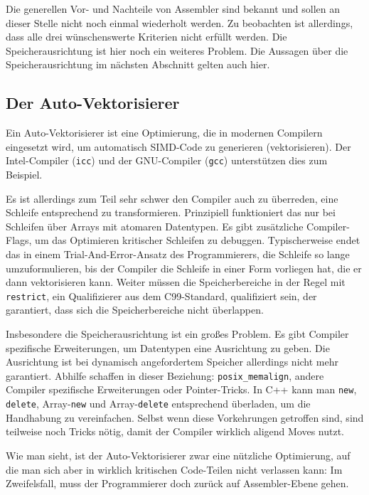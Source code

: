 \documentclass[a4paper,10pt]{article}
\begin{document}
Die generellen Vor- und Nachteile von Assembler sind bekannt und sollen an dieser Stelle nicht noch
einmal wiederholt werden. Zu beobachten ist allerdings, dass alle drei wünschenswerte Kriterien
nicht erfüllt werden. Die Speicherausrichtung ist hier noch ein weiteres Problem. Die Aussagen über
die Speicherausrichtung im nächsten Abschnitt gelten auch hier.

\subsection{Der Auto-Vektorisierer}

Ein Auto-Vektorisierer ist eine Optimierung, die in modernen Compilern eingesetzt wird, um
automatisch SIMD-Code zu generieren (vektorisieren). Der Intel-Compiler (\texttt{icc}) und der
GNU-Compiler (\texttt{gcc}) unterstützen dies zum Beispiel. 

Es ist allerdings zum Teil sehr schwer den Compiler auch zu überreden, eine Schleife entsprechend zu
transformieren. Prinzipiell funktioniert das nur bei Schleifen über Arrays mit atomaren Datentypen.
Es gibt zusätzliche Compiler-Flags, um das Optimieren kritischer Schleifen zu debuggen.
Typischerweise endet das in einem Trial-And-Error-Ansatz des Programmierers, die Schleife so lange
umzuformulieren, bis der Compiler die Schleife in einer Form vorliegen hat, die er dann
vektorisieren kann. Weiter müssen die Speicherbereiche in der Regel mit \texttt{restrict}, ein
Qualifizierer aus dem C99-Standard, qualifiziert sein, der garantiert, dass sich die
Speicherbereiche nicht überlappen.

Insbesondere die Speicherausrichtung ist ein großes Problem. Es gibt Compiler spezifische
Erweiterungen, um Datentypen eine Ausrichtung zu geben. Die Ausrichtung ist bei dynamisch
angefordertem Speicher allerdings nicht mehr garantiert. Abhilfe schaffen in dieser Beziehung:
\texttt{posix\_memalign}, andere Compiler spezifische Erweiterungen oder Pointer-Tricks. In C++ kann
man \texttt{new}, \texttt{delete}, Array-\texttt{new} und Array-\texttt{delete} entsprechend
überladen, um die Handhabung zu vereinfachen. Selbst wenn diese Vorkehrungen getroffen sind, sind
teilweise noch Tricks nötig, damit der Compiler wirklich aligend Moves nutzt.

Wie man sieht, ist der Auto-Vektorisierer zwar eine nützliche Optimierung, auf die man sich aber in wirklich
kritischen Code-Teilen nicht verlassen kann: Im Zweifelsfall, muss der Programmierer doch zurück auf 
Assembler-Ebene gehen.
\end{document}
